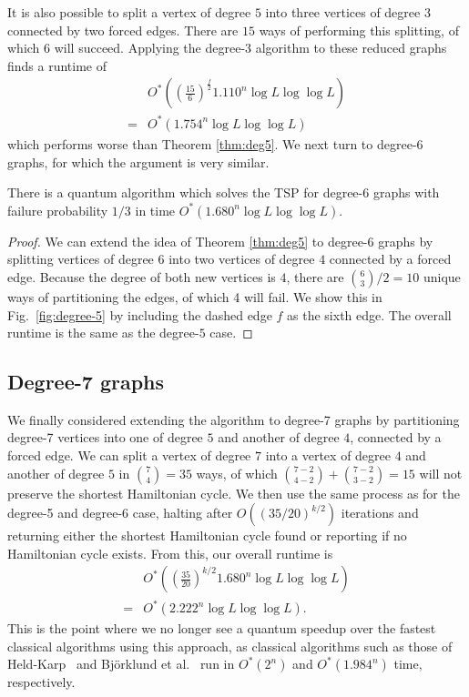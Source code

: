 %
It is also possible to split a vertex of degree $5$ into three vertices of degree $3$ connected by two forced edges. There are $15$ ways of performing this splitting, of which $6$ will succeed. Applying the degree-$3$ algorithm to these reduced graphs finds a runtime of
%
\begin{align}
&O^*\left(\left(\frac{15}{6}\right)^{\frac{f}{2}}1.110^n\log L \log \log L\right)\\
 = &O^*(1.754^n\log L \log \log L)
\end{align}
%
\noindent which performs worse than Theorem \ref{thm:deg5}. We next turn to degree-6 graphs, for which the argument is very similar.

\begin{theorem}
There is a quantum algorithm which solves the TSP for degree-$6$ graphs with failure probability $1/3$ in time $O^*(1.680^n\log L \log \log L)$.
\end{theorem}

\begin{proof}
We can extend the idea of Theorem \ref{thm:deg5} to degree-6 graphs by splitting vertices of degree $6$ into two vertices of degree $4$ connected by a forced edge. Because the degree of both new vertices is $4$, there are $\binom{6}{3}/2 = 10$ unique ways of partitioning the edges, of which 4 will fail. We show this in Fig.\ \ref{fig:degree-5} by including the dashed edge $f$ as the sixth edge. The overall runtime is the same as the degree-$5$ case.
\end{proof}

\subsection{Degree-7 graphs}

We finally considered extending the algorithm to degree-7 graphs by partitioning degree-7 vertices into one of degree $5$ and another of degree $4$, connected by a forced edge. We can split a vertex of degree $7$ into a vertex of degree $4$ and another of degree $5$ in $\binom{7}{4} = 35$ ways, of which $\binom{7-2}{4-2} + \binom{7-2}{3-2} = 15$ will not preserve the shortest Hamiltonian cycle. We then use the same process as for the degree-5 and degree-6 case, halting after $O((35/20)^{k/2})$ iterations and returning either the shortest Hamiltonian cycle found or reporting if no Hamiltonian cycle exists. From this, our overall runtime is
%
\begin{align}
&O^*\left(\left(\frac{35}{20}\right)^{k/2}1.680^n\log L \log \log L\right)\\
=&O^*(2.222^n\log L \log \log L).
\end{align}
%
This is the point where we no longer see a quantum speedup over the fastest classical algorithms using this approach, as classical algorithms such as those of Held-Karp~\cite{held1962} and Bj{\"o}rklund et al.~\cite{bjorklund2008} run in $O^*(2^n)$ and $O^*(1.984^n)$ time, respectively.

